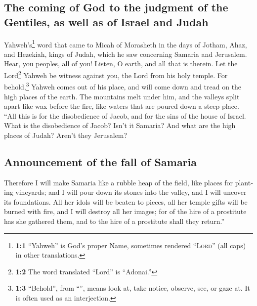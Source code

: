 \begin{paracol}{2}
\begin{otherlanguage}{english}
\hypertarget{the-coming-of-god-to-the-judgment-of-the-gentiles-as-well-as-of-israel-and-judah}{%
\subsection{The coming of God to the judgment of the Gentiles, as well
as of Israel and
Judah}\label{the-coming-of-god-to-the-judgment-of-the-gentiles-as-well-as-of-israel-and-judah}}

 Yahweh's\footnote{\textbf{1:1} ``Yahweh'' is God's proper
  Name, sometimes rendered ``\textsc{Lord}'' (all caps) in other
  translations.} word that came to Micah of Morasheth in the days of
Jotham, Ahaz, and Hezekiah, kings of Judah, which he saw concerning
Samaria and Jerusalem.  Hear, you peoples, all of you!
Listen, O earth, and all that is therein. Let the Lord\footnote{\textbf{1:2}
  The word translated ``Lord'' is ``Adonai.''} Yahweh be witness against
you, the Lord from his holy temple.  For
behold,\footnote{\textbf{1:3} ``Behold'', from ``'', means
  look at, take notice, observe, see, or gaze at. It is often used as an
  interjection.} Yahweh comes out of his place, and will come down and
tread on the high places of the earth.  The mountains melt
under him, and the valleys split apart like wax before the fire, like
waters that are poured down a steep place.  ``All this is
for the disobedience of Jacob, and for the sins of the house of Israel.
What is the disobedience of Jacob? Isn't it Samaria? And what are the
high places of Judah? Aren't they Jerusalem?

\hypertarget{announcement-of-the-fall-of-samaria}{%
\subsection{Announcement of the fall of
Samaria}\label{announcement-of-the-fall-of-samaria}}

 Therefore I will make Samaria like a rubble heap of the
field, like places for planting vineyards; and I will pour down its
stones into the valley, and I will uncover its foundations.
 All her idols will be beaten to pieces, all her temple
gifts will be burned with fire, and I will destroy all her images; for
of the hire of a prostitute has she gathered them, and to the hire of a
prostitute shall they return.''

\hypertarget{micahs-denunciation-of-a-criminal-court-approaching-through-an-overwhelming-enemy}{%
}
\end{otherlanguage}
\end{paracol}

